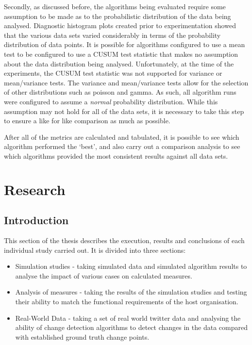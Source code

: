\documentclass{uvamscse}	%
\begin{document}
Secondly, as discussed before, the algorithms being evaluated require some assumption to be made as to the probabilistic distribution of the data being analysed. Diagnostic histogram plots created prior to experimentation showed that the various data sets varied considerably in terms of the probability distribution of data points. It is possible for algorithms configured to use a mean test to be configured to use a CUSUM test statistic that makes no assumption about the data distribution being analysed. Unfortunately, at the time of the experiments, the CUSUM test statistic was not supported for variance or mean/variance tests. The variance and mean/variance tests allow for the selection of other distributions such as poisson and gamma. As such, all algorithm runs were configured to assume a \emph{normal} probability distribution. While this assumption may not hold for all of the data sets, it is necessary to take this step to ensure a like for like comparison as much as possible.

After all of the metrics are calculated and tabulated, it is possible to see which algorithm performed the `best', and also carry out a comparison analysis to see which algorithms provided the most consistent results against all data sets.








\chapter{Research}

\section{Introduction}

This section of the thesis describes the execution, results and conclusions of each individual study carried out. It is divided into three sections:

\begin{itemize}
    \item Simulation studies - taking simulated data and simulated algorithm results to analyse the impact of various cases on calculated measures.
    \item Analysis of measures - taking the results of the simulation studies and testing their ability to match the functional requirements of the host organisation.
    \item Real-World Data - taking a set of real world twitter data and analysing the ability of change detection algorithms to detect changes in the data compared with established ground truth change points.
\end{itemize}
\end{document}
